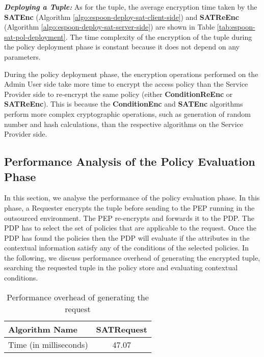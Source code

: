 \documentclass[epsfig,a4paper,11pt,titlepage]{book}
\numberwithin{algorithm}{chapter}
\begin{document}
\noindent \emph{\textbf{Deploying a  Tuple:}}
As for the  tuple, the average encryption time taken by the \textbf{SATEnc} (Algorithm \ref{algo:espoon-deploy-sat-client-side}) and \textbf{SATReEnc} (Algorithm \ref{algo:espoon-deploy-sat-server-side}) are shown in Table \ref{tab:espoon-sat-pol-deployment}. The time complexity of the encryption of the  tuple during the policy deployment phase is constant because it does not depend on any parameters.

During the policy deployment phase, the encryption operations performed on the Admin User side take more time to encrypt the access policy than the Service Provider side to re-encrypt the same policy (either \textbf{ConditionReEnc} or \textbf{SATReEnc}). This is because the \textbf{ConditionEnc} and \textbf{SATEnc} algorithms perform more complex cryptographic operations, such as generation of random number and hash calculations, than the respective algorithms on the Service Provider side.


\subsection{Performance Analysis of the Policy Evaluation Phase}
\label{sec:espoon-policy-evaluation}

In this section, we analyse the performance of the policy evaluation phase. In this phase, a Requester encrypts the  tuple before sending to the \gls{PEP} running in the outsourced environment. The \gls{PEP} re-encrypts and forwards it to the \gls{PDP}. The \gls{PDP} has to select the set of policies that are applicable to the request. Once the \gls{PDP} has found the policies then the \gls{PDP} will evaluate if the attributes in the contextual information satisfy any of the conditions of the selected policies. In the following, we discuss performance overhead of generating the encrypted  tuple, searching the requested  tuple in the policy store and evaluating contextual conditions.

\begin{table} [htp]
\centering
\caption{Performance overhead of generating the  request}
\label{tab:espoon-sat-pol-eval}
\begin{tabular}{ |l|c| }
\hline
\textbf{Algorithm Name} & \textbf{SATRequest} \\ \hline
Time (in milliseconds) & 47.07 \\ \hline
\end{tabular}
\end{table}
\end{document}
